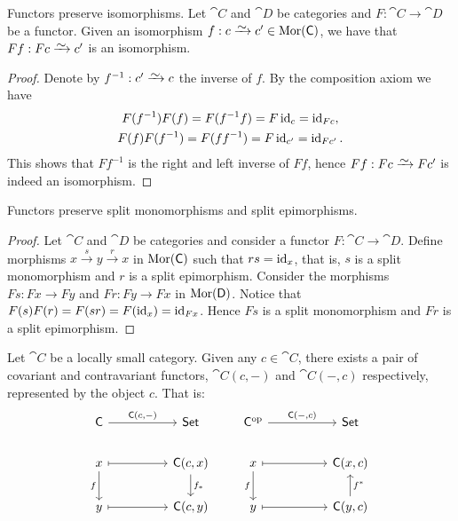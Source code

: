 \begin{lemma}\label{lem: functor preserve iso}
  Functors preserve isomorphisms. Let \(\cat C\) and \(\cat D\) be categories
  and \(F: \cat C \to \cat D\) be a functor. Given an isomorphism \(f: c \isoto
  c' \in \Mor(\cat C)\), we have that \(F f : F c \isoto c'\) is an isomorphism.
\end{lemma}

\begin{proof}
  Denote by \(f^{-1}: c' \isoto c\) the inverse of \(f\). By the composition
  axiom we have
  \begin{gather*}
    F (f^{-1}) F (f) = F (f^{-1} f) = F \operatorname{id}_c    = \operatorname{id}_{F c}, \\
    F (f) F (f^{-1}) = F (f f^{-1}) = F \operatorname{id}_{c'} = \operatorname{id}_{F c'}.
  \end{gather*}
  This shows that \(F f^{-1}\) is the right and left inverse of \(F f\), hence
  \(F f: F c \isoto F c'\) is indeed an isomorphism.
\end{proof}

\begin{lemma}
  Functors preserve split monomorphisms and split epimorphisms.
\end{lemma}

\begin{proof}
  Let \(\cat C\) and \(\cat D\) be categories and consider a functor \(F: \cat C
  \to \cat D\). Define morphisms \(x \xrightarrow s y \xrightarrow r x\) in
  \(\operatorname{Mor}(\mathsf C)\) such that \(r s = \operatorname{id}_x\), that is, \(s\) is a split
  monomorphism and \(r\) is a split epimorphism. Consider the morphisms \(F s: F
  x \to F y\) and \(F r: F y \to F x\) in \(\operatorname{Mor}(\mathsf D)\). Notice that \(F (s)
  F(r) = F(s r) = F(\operatorname{id}_x) = \operatorname{id}_{F x}\). Hence \(F s\) is a split monomorphism
and \(F r\) is a split epimorphism.
\end{proof}

\begin{definition}
  Let \(\cat C\) be a locally small category. Given any \(c \in \cat C\), there
  exists a pair of covariant and contravariant functors, \(\cat C(c, -)\) and
  \(\cat C(-, c)\) respectively, represented by the object \(c\). That is:
  \[
    \begin{tikzcd}
      \cat C \ar[rr, "\cat C{(c, -)}"] & & \Set
      \\
      x \ar[rr, maps to] \ar[d, swap, "f"]
      & & \cat C(c, x) \ar[d, "f_*"]
      \\
      y \ar[rr, maps to] & & \cat C(c, y)
    \end{tikzcd}
    \qquad
    \begin{tikzcd}
      \cat C^\op \ar[rr, "\cat C{(-, c)}"] & & \Set
      \\
      x \ar[rr, maps to] \ar[d, swap, "f"]
      & & \cat C(x, c)
      \\
      y \ar[rr, maps to] & & \cat C(y, c) \ar[u, swap, "f^*"]
    \end{tikzcd}
  \]
\end{definition}

